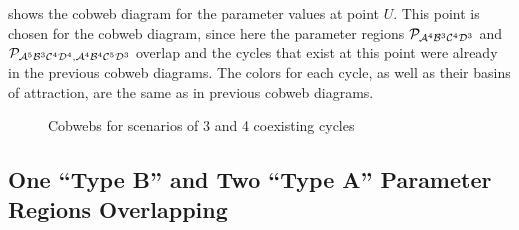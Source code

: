  shows the cobweb diagram for the parameter values at point $U$.
This point is chosen for the cobweb diagram, since here the parameter regions $\mathcal{P}_{\mathcal{A}^4\mathcal{B}^3\mathcal{C}^4\mathcal{D}^3}$ and $\mathcal{P}_{\mathcal{A}^5\mathcal{B}^3\mathcal{C}^4\mathcal{D}^4, \mathcal{A}^4\mathcal{B}^4\mathcal{C}^5\mathcal{D}^3}$ overlap and the cycles that exist at this point were already in the previous cobweb diagrams.
The colors for each cycle, as well as their basins of attraction, are the same as in previous cobweb diagrams.

\begin{figure}
    \centering
    \caption{Cobwebs for scenarios of 3 and 4 coexisting cycles}
\end{figure}

\subsection{One ``Type B'' and Two ``Type A'' Parameter Regions Overlapping}

